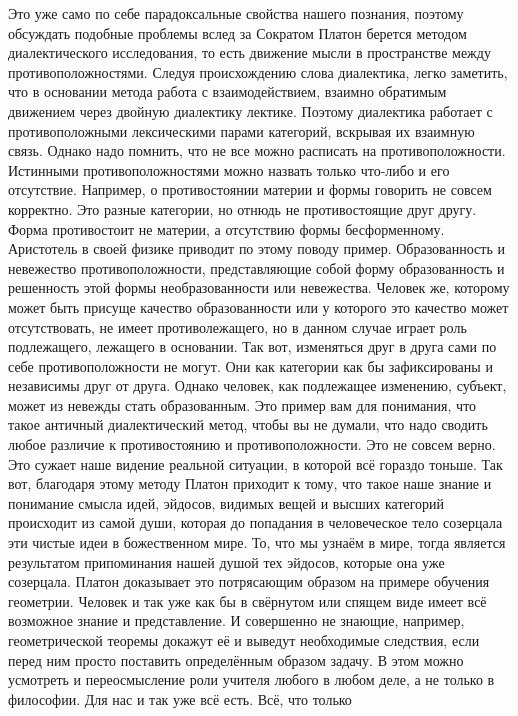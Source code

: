 Это уже само по себе парадоксальные свойства нашего познания, поэтому
обсуждать подобные проблемы вслед за Сократом Платон берется методом
диалектического исследования, то есть движение мысли в пространстве между
противоположностями. Следуя происхождению слова диалектика, легко заметить, что
в основании метода работа с взаимодействием, взаимно обратимым движением через
двойную диалектику лектике. Поэтому диалектика работает с противоположными
лексическими парами категорий, вскрывая их взаимную связь. Однако надо помнить,
что не все можно расписать на противоположности. Истинными противоположностями
можно назвать только что-либо и его отсутствие. Например, о противостоянии
материи и формы говорить не совсем корректно. Это разные категории, но отнюдь не
противостоящие друг другу. Форма противостоит не материи, а отсутствию формы
бесформенному. Аристотель в своей физике приводит по этому поводу пример.
Образованность и невежество противоположности, представляющие собой форму
образованность и решенность этой формы необразованности или невежества. Человек
же, которому может быть присуще качество образованности или у которого это
качество может отсутствовать, не имеет противолежащего, но в данном случае
играет роль подлежащего, лежащего в основании. Так вот, изменяться друг в друга
сами по себе противоположности не могут. Они как категории как бы зафиксированы
и независимы друг от друга. Однако человек, как подлежащее изменению, субъект,
может из невежды стать образованным. Это пример вам для понимания, что такое
античный диалектический метод, чтобы вы не думали, что надо сводить любое
различие к противостоянию и противоположности. Это не совсем верно. Это сужает
наше видение реальной ситуации, в которой всё гораздо тоньше. Так вот, благодаря
этому методу Платон приходит к тому, что такое наше знание и понимание смысла
идей, эйдосов, видимых вещей и высших категорий происходит из самой души,
которая до попадания в человеческое тело созерцала эти чистые идеи в
божественном мире. То, что мы узнаём в мире, тогда является результатом
припоминания нашей душой тех эйдосов, которые она уже созерцала. Платон
доказывает это потрясающим образом на примере обучения геометрии. Человек и так
уже как бы в свёрнутом или спящем виде имеет всё возможное знание и
представление. И совершенно не знающие, например, геометрической теоремы докажут
её и выведут необходимые следствия, если перед ним просто поставить определённым
образом задачу. В этом можно усмотреть и переосмысление роли учителя любого в
любом деле, а не только в философии. Для нас и так уже всё есть. Всё, что только
